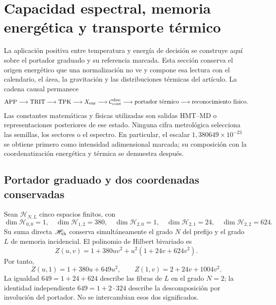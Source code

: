 \section{Capacidad espectral, memoria energética y transporte térmico}
\label{v:sec:capacidad-espectral-termica}

La aplicación positiva entre temperatura y energía de decisión se construye
aquí sobre el portador graduado y su referencia marcada. Esta sección
conserva el origen
energético que una normalización no ve y compone esa lectura con el calendario,
el área, la gravitación y las distribuciones térmicas del artículo. La cadena
causal permanece
\[
 \mathrm{APP}\longrightarrow\mathrm{TRIT}\longrightarrow\mathrm{TPK}
 \longrightarrow X_{\rm enr}
 \longrightarrow\mathcal C_{\rm cont}^{\rm disc}
 \longrightarrow\text{portador térmico}
 \longrightarrow\text{reconocimiento físico}.
\]
Las constantes matemáticas y físicas utilizadas son salidas HMT--MD o
representaciones posteriores de ese estado. Ninguna cifra metrológica selecciona
las semillas, los sectores o el espectro. En particular, el escalar
$1{,}380649\times10^{-23}$ se obtiene primero como intensidad adimensional
marcada; su composición con la coordenatización energética y térmica se demuestra
después.

\subsection{Portador graduado y dos coordenadas conservadas}

Sean $\mathscr H_{N,L}$ cinco espacios finitos, con
\begin{equation}
 \dim\mathscr H_{0,0}=1,\quad
 \dim\mathscr H_{1,2}=380,\quad
 \dim\mathscr H_{2,0}=1,\quad
 \dim\mathscr H_{2,1}=24,\quad
 \dim\mathscr H_{2,2}=624.
 \label{v:eq:fibras-termicas-NL}
\end{equation}
Su suma directa $\mathscr H_{\rm th}$ conserva simultáneamente el grado
$N$ del prefijo y el grado $L$ de memoria incidencial. El polinomio de
Hilbert bivariado es
\begin{equation}
 Z(u,v)=1+380uv^2+u^2(1+24v+624v^2).
 \label{v:eq:polinomio-graduado-termico}
\end{equation}
Por tanto,
\[
 Z(u,1)=1+380u+649u^2,\qquad
 Z(1,v)=2+24v+1004v^2.
\]
La igualdad $649=1+24+624$ describe las fibras de $L$ en el grado $N=2$;
la identidad independiente $649=1+2\cdot324$ describe la descomposición
por involución del portador. No se intercambian esos dos significados.

